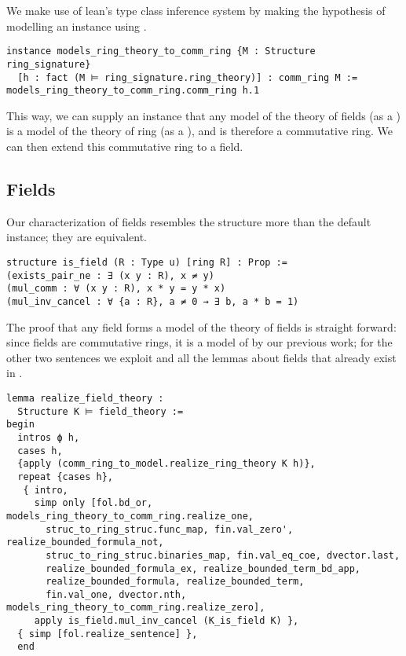 We make use of lean's type class inference system by making
the hypothesis of modelling  an instance
using .

\begin{lstlisting}
instance models_ring_theory_to_comm_ring {M : Structure ring_signature}
  [h : fact (M ⊨ ring_signature.ring_theory)] : comm_ring M :=
models_ring_theory_to_comm_ring.comm_ring h.1 \end{lstlisting}

This way, we can supply an instance that any model of the theory of fields
(as a ) is a model of the theory of ring (as a ),
and is therefore a commutative ring.
We can then extend this commutative ring to a field.

\subsection{Fields}

Our characterization of fields resembles the structure 
more than the default  instance;
they are equivalent.

\begin{lstlisting}
structure is_field (R : Type u) [ring R] : Prop :=
(exists_pair_ne : ∃ (x y : R), x ≠ y)
(mul_comm : ∀ (x y : R), x * y = y * x)
(mul_inv_cancel : ∀ {a : R}, a ≠ 0 → ∃ b, a * b = 1)\end{lstlisting}

The proof that any field forms a model of the theory of fields is straight forward:
since fields are commutative rings, it is a model of 
by our previous work; for the other two sentences we exploit 
and all the lemmas about fields that already exist in .

\begin{lstlisting}
lemma realize_field_theory :
  Structure K ⊨ field_theory :=
begin
  intros ϕ h,
  cases h,
  {apply (comm_ring_to_model.realize_ring_theory K h)},
  repeat {cases h},
   { intro,
     simp only [fol.bd_or, models_ring_theory_to_comm_ring.realize_one,
       struc_to_ring_struc.func_map, fin.val_zero', realize_bounded_formula_not,
       struc_to_ring_struc.binaries_map, fin.val_eq_coe, dvector.last,
       realize_bounded_formula_ex, realize_bounded_term_bd_app,
       realize_bounded_formula, realize_bounded_term,
       fin.val_one, dvector.nth, models_ring_theory_to_comm_ring.realize_zero],
     apply is_field.mul_inv_cancel (K_is_field K) },
  { simp [fol.realize_sentence] },
  end\end{lstlisting}

